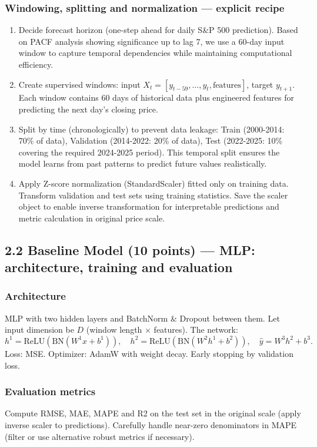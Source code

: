 \documentclass[conference]{IEEEtran}
\begin{document}
\subsubsection{Windowing, splitting and normalization — explicit recipe}
\begin{enumerate}
  \item Decide forecast horizon (one-step ahead for daily S\&P 500 prediction). Based on PACF analysis showing significance up to lag 7, we use a 60-day input window to capture temporal dependencies while maintaining computational efficiency.
  \item Create supervised windows: input $X_t = [y_{t-59},\dots,y_t, \text{features}]$, target $y_{t+1}$. Each window contains 60 days of historical data plus engineered features for predicting the next day's closing price.
  \item Split by time (chronologically) to prevent data leakage: Train (2000-2014: 70\% of data), Validation (2014-2022: 20\% of data), Test (2022-2025: 10\% covering the required 2024-2025 period). This temporal split ensures the model learns from past patterns to predict future values realistically.
  \item Apply Z-score normalization (StandardScaler) fitted only on training data. Transform validation and test sets using training statistics. Save the scaler object to enable inverse transformation for interpretable predictions and metric calculation in original price scale.
\end{enumerate}

\subsection{2.2 Baseline Model (10 points) — MLP: architecture, training and evaluation}
\subsubsection{Architecture}
MLP with two hidden layers and BatchNorm \& Dropout between them. Let input dimension be $D$ (window length $\times$ features). The network:
\[ h^1 = \text{ReLU}(\text{BN}(W^1 x + b^1)),\quad h^2 = \text{ReLU}(\text{BN}(W^2 h^1 + b^2)),\quad \hat{y}=W^3 h^2 + b^3.\]
Loss: MSE. Optimizer: AdamW with weight decay. Early stopping by validation loss.

\subsubsection{Evaluation metrics}
Compute RMSE, MAE, MAPE and R2 on the test set in the original scale (apply inverse scaler to predictions). Carefully handle near-zero denominators in MAPE (filter or use alternative robust metrics if necessary).
\end{document}
